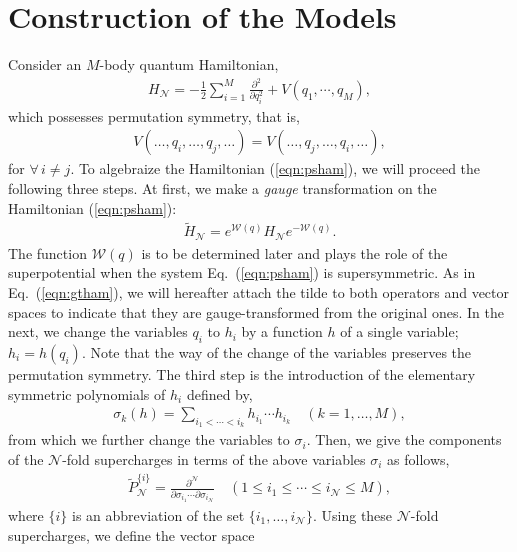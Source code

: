 \documentclass[a4paper,preprint,amsfonts,amssymb,amsmath,%
tightenlines,nofootinbib,noshowpacs]{revtex4}
\newcommand{\cN}{\mathcal{N}}
\newcommand{\cW}{\mathcal{W}}
\begin{document}
\section{\label{sec:const}Construction of the Models}

Consider an $M$-body quantum Hamiltonian,
\begin{eqnarray}
H_{\cN}=-\frac{1}{2}\sum_{i=1}^{M}\frac{\partial^{2}}%
{\partial q_{i}^{2}}+V(q_{1},\cdots,q_{M}),
\label{eqn:psham}
\end{eqnarray}
which possesses permutation symmetry, that is,
\begin{eqnarray}
V({}\ldots,q_{i},\ldots,q_{j},\ldots)=
V({}\ldots,q_{j},\ldots,q_{i},\ldots),
\label{eqn:pspot}
\end{eqnarray}
for $\forall\, i\neq j$.
To algebraize the Hamiltonian (\ref{eqn:psham}), we will proceed
the following three steps. At first, we make a \textit{gauge}
transformation on the Hamiltonian (\ref{eqn:psham}):
\begin{eqnarray}
\tilde{H}_{\cN}=e^{\cW(q)}H_{\cN}e^{-\cW(q)}.
\label{eqn:gtham}
\end{eqnarray}
The function $\cW(q)$ is to be determined later and plays the role
of the superpotential when the system Eq.~(\ref{eqn:psham}) is
supersymmetric. As in Eq.~(\ref{eqn:gtham}), we will hereafter
attach the tilde to both operators and vector spaces to indicate
that they are gauge-transformed from the original ones. In the next,
we change the variables $q_{i}$ to $h_{i}$ by a function
$h$ of a single variable; $h_{i}=h(q_{i})$.
Note that the way of the change of the variables preserves
the permutation symmetry. The third step is the introduction of
the elementary symmetric polynomials of $h_{i}$ defined by,
\begin{eqnarray}
\sigma_{k}(h)=\sum_{i_{1}<\cdots <i_{k}}h_{i_{1}}\cdots h_{i_{k}}
\quad (k=1,\ldots,M),
\label{eqn:sigma}
\end{eqnarray}
from which we further change the variables to $\sigma_{i}$.
Then, we give the components of the $\cN$-fold supercharges in terms
of the above variables $\sigma_{i}$ as follows,
\begin{eqnarray}
\tilde{P}_{\cN}^{\{i\}}=\frac{\partial^{\cN}}%
{\partial\sigma_{i_{1}}\cdots\partial\sigma_{i_{\cN}}}
\quad (1\le i_{1}\le\cdots\le i_{\cN}\le M),
\label{eqn:cptsc}
\end{eqnarray}
where $\{i\}$ is an abbreviation of the set $\{i_{1},\ldots,i_{\cN}\}$.
Using these $\cN$-fold supercharges, we define the vector space
\end{document}

